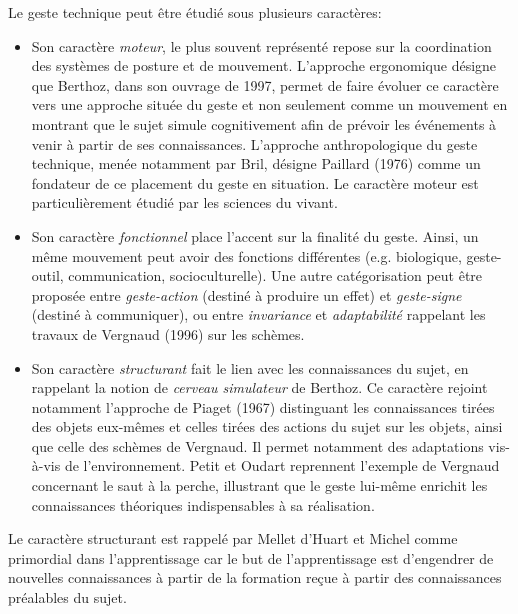 \documentclass{article}
\begin{document}
Le geste technique peut être étudié sous plusieurs caractères:
\begin{itemize}
\item Son caractère \emph{moteur}, le plus souvent représenté repose sur 
la coordination des systèmes de posture et de mouvement. L'approche 
ergonomique désigne que Berthoz, dans son ouvrage de 1997, permet de 
faire évoluer ce caractère vers une approche située du geste et non 
seulement comme un mouvement en montrant que le sujet simule cognitivement 
afin de prévoir les événements à venir à partir de ses connaissances. 
L'approche anthropologique du geste technique, menée notamment par Bril, 
désigne Paillard (1976) comme un fondateur de ce placement du geste en 
situation. Le caractère moteur est particulièrement étudié par les 
sciences du vivant.
\item Son caractère \emph{fonctionnel} place l'accent sur la finalité du 
geste. Ainsi, un même mouvement peut avoir des fonctions différentes 
(e.g. biologique, geste-outil, communication, socioculturelle). Une autre 
catégorisation peut être proposée entre \emph{geste-action} (destiné à 
produire un effet) et \emph{geste-signe} (destiné à communiquer), ou 
entre \emph{invariance} et \emph{adaptabilité} rappelant les travaux de 
Vergnaud (1996) sur les schèmes.
\item Son caractère \emph{structurant} fait le lien avec les connaissances 
du sujet, en rappelant la notion de \emph{cerveau simulateur} de Berthoz. 
Ce caractère rejoint notamment l'approche de Piaget (1967) distinguant les 
connaissances tirées des objets eux-mêmes et celles tirées des actions du 
sujet sur les objets, ainsi que celle des schèmes de Vergnaud. Il permet 
notamment des adaptations vis-à-vis de l'environnement. Petit et Oudart 
\cite{petit_apprendre_2017} reprennent l'exemple de Vergnaud concernant 
le saut à la perche, illustrant que le geste lui-même enrichit les 
connaissances théoriques indispensables à sa réalisation.
\end{itemize}
Le caractère structurant est rappelé par Mellet d'Huart et Michel 
\cite{mellet-dhuart_faciliter_2005} comme primordial dans l'apprentissage 
car le but de l'apprentissage est d'engendrer de nouvelles connaissances 
à partir de la formation reçue à partir des connaissances préalables du 
sujet.
\end{document}
